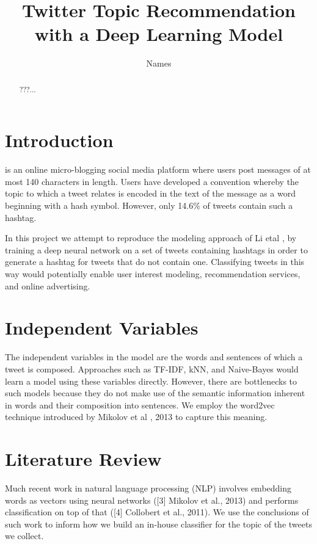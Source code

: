 \documentclass[journal, a4paper]{IEEEtran}
\begin{document}
	\title{Twitter Topic Recommendation with a Deep Learning Model}
	\author{Names}
	\maketitle

\begin{abstract}
???...
\end{abstract}

\section{Introduction}
	 is an online micro-blogging social media platform where users post messages of at most 140 characters in length. Users have developed a convention whereby the topic to which a tweet relates is encoded in the text of the message as a word beginning with a hash symbol. However, only 14.6\% of tweets contain such a hashtag.

	
	In this project we attempt to reproduce the modeling approach of Li etal \cite{Li-lstm}, by training a deep neural network on a set of tweets containing hashtags in order to generate a hashtag for tweets that do not contain one. Classifying tweets in this way would potentially enable user interest modeling, recommendation services, and online advertising.

\section{Independent Variables}
The independent variables in the model are the words and sentences of which a tweet is composed. Approaches such as TF-IDF, kNN, and Naive-Bayes would learn a model using these variables directly. However, there are bottlenecks to such models because they do not make use of the semantic information inherent in words and their composition into sentences. We employ the word2vec technique introduced by Mikolov et al \cite{word2vec}, 2013 to capture this meaning.
\section{Literature Review}
	Much recent work in natural language processing (NLP) involves embedding words as vectors using neural networks ([3] Mikolov et al., 2013) and performs classification on top of that ([4] Collobert et al., 2011). We use the conclusions of such work to inform how we build an in-house classifier for the topic of the tweets we collect.
\end{document}
